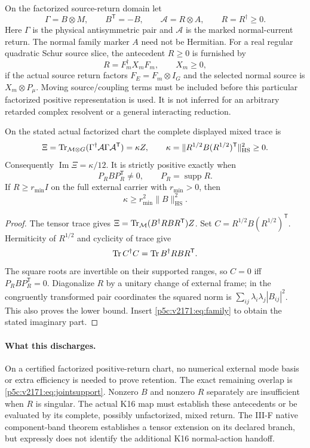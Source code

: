 \documentclass[12pt,a4paper]{article}
\begin{document}
On the factorized source-return domain let
\[
 \Gamma=B\otimes M,\qquad B^{\mathsf T}=-B,\qquad
 \mathcal A=R\otimes A,\qquad R=R^\dagger\geq0.
\]
Here $\Gamma$ is the physical antisymmetric pair and $\mathcal A$ is the
marked normal-current return. The normal family marker $A$ need not be
Hermitian. For a real regular quadratic Schur source slice, the antecedent
$R\geq0$ is furnished by
\[
 R=F_m^\dagger X_mF_m,\qquad X_m\geq0,
\]
if the actual source return factors $F_E=F_m\otimes I_G$ and the selected
normal source is $X_m\otimes P_\mu$. Moving source/coupling terms must be
included before this particular factorized positive representation is used.
It is not inferred for an arbitrary retarded complex resolvent or a general
interacting reduction.

\begin{theorem}\label{p5c:v2171:thm:positive}
On the stated actual factorized chart the complete displayed mixed trace is
\begin{equation}\label{p5c:v2171:eq:kappa}
 \Xi=\operatorname{Tr}_{\mathcal M\otimes G}
 (\Gamma^\dagger\mathcal A\Gamma\mathcal A^{\mathsf T})
 =\kappa Z,\qquad
 \kappa=\|R^{1/2}B(R^{1/2})^{\mathsf T}\|_{\mathrm{HS}}^2\geq0.
\end{equation}
Consequently $\operatorname{Im}\Xi=\kappa/12$. It is strictly positive
exactly when
\begin{equation}\label{p5c:v2171:eq:jointsupport}
 P_RBP_R^{\mathsf T}\ne0,\qquad P_R=\operatorname{supp} R.
\end{equation}
If $R\geq r_{\min}I$ on the full external carrier with $r_{\min}>0$, then
\[
 \kappa\geq r_{\min}^2\|B\|_{\mathrm{HS}}^2.
\]
\end{theorem}
\begin{proof}
The tensor trace gives
$\Xi=\operatorname{Tr}_{\mathcal M}(B^\dagger RBR^{\mathsf T})Z$.
Set $C=R^{1/2}B(R^{1/2})^{\mathsf T}$. Hermiticity of $R^{1/2}$ and
cyclicity of trace give
\[
 \operatorname{Tr} C^\dagger C=\operatorname{Tr} B^\dagger RBR^{\mathsf T}.
\]
The square roots are invertible on their supported ranges, so $C=0$ iff
$P_RBP_R^{\mathsf T}=0$. Diagonalize $R$ by a unitary change of external
frame; in the congruently transformed pair coordinates the squared norm is
$\sum_{ij}\lambda_i\lambda_j|B_{ij}|^2$. This also proves the lower bound.
Insert \eqref{p5c:v2171:eq:family} to obtain the stated imaginary part.
\end{proof}

\paragraph{What this discharges.}
On a certified factorized positive-return chart, no numerical external mode
basis or extra efficiency is needed to prove retention. The exact remaining
overlap is \eqref{p5c:v2171:eq:jointsupport}. Nonzero $B$ and nonzero $R$ separately
are insufficient when $R$ is singular. The actual K16 map must establish
these antecedents or be evaluated by its complete, possibly unfactorized,
mixed return. The III-F native component-band theorem establishes a tensor
extension on its declared branch, but expressly does not identify the
additional K16 normal-action handoff.
\end{document}
